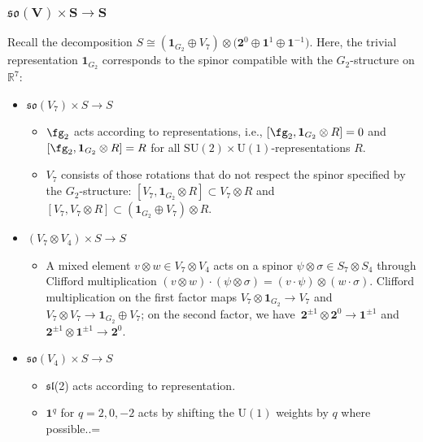\documentclass[pdftex]{sigma}
\numberwithin{equation}{section}
\theoremstyle{definition}
\def\R{\mathbb{R}}
\def\lie#1{\ensuremath{\mathfrak{#1}}}
\def\U{\ensuremath{\mathrm{U}}}
\def\SU{\ensuremath{\mathrm{SU}}}
\begin{document}
\subsubsection[so(V) times S longrightarrow S]{$\boldsymbol{\lie{so}(V) \times S \longrightarrow S}$}
Recall the decomposition
$
 S \cong (\textbf{1}_{G_2} \oplus V_7) \otimes \big(\textbf{2}^0 \oplus \textbf{1}^1 \oplus \textbf{1}^{-1}\big)$.
Here, the trivial representation $\textbf{1}_{G_2}$ corresponds to the spinor compatible with the $G_2$-structure on $\R^7$:
\begin{itemize}\itemsep=0pt
 \item[] \underline{$\lie{so}(V_7) \times S \longrightarrow S$}
 \begin{itemize}\itemsep=0pt
\item[--] $\fg_2$ acts according to representations, i.e., $[\fg_2 , \textbf{1}_{G_2} \otimes R] = 0$ and $[\fg_2 , \textbf{1}_{G_2} \otimes R] = R$ for all $\SU(2) \times \U(1)$-representations $R$.
\item[--] $V_7$ consists of those rotations that do not respect the spinor specified by the $G_2$-structure: $[V_7, \textbf{1}_{G_2} \otimes R] \subset V_7 \otimes R$ and $[V_7, V_7 \otimes R] \subset (\textbf{1}_{G_2} \oplus V_7) \otimes R$.
 \end{itemize}
 \item[] \underline{$(V_7 \otimes V_4) \times S \longrightarrow S$}
 \begin{itemize}\itemsep=0pt
\item[--] A mixed element $v \otimes w \in V_7 \otimes V_4$ acts on a spinor $\psi \otimes \sigma \in S_7 \otimes S_4$ through Clifford multiplication $(v \otimes w) \cdot (\psi \otimes \sigma) = (v \cdot \psi) \otimes (w \cdot \sigma)$. Clifford multiplication on the first factor maps $V_7 \otimes \textbf{1}_{G_2} \longrightarrow V_7$ and $V_7 \otimes V_7 \longrightarrow \textbf{1}_{G_2} \oplus V_7$; on the second factor, we have~${\textbf{2}^{\pm 1} \otimes \textbf{2}^0 \longrightarrow \textbf{1}^{\pm 1}}$ and $\textbf{2}^{\pm 1} \otimes \textbf{1}^{\pm 1} \longrightarrow \textbf{2}^{0}$.
 \end{itemize}
 \item[]\underline{$\lie{so}(V_4) \times S \longrightarrow S$}
 \begin{itemize}\itemsep=0pt
 \item[--] \lie{sl}(2) acts according to representation.
 \item[--] $\textbf{1}^q$ for $q = 2,0,-2$ acts by shifting the $\U(1)$ weights by $q$ where possible..=
 \end{itemize}
\end{itemize}
\end{document}
